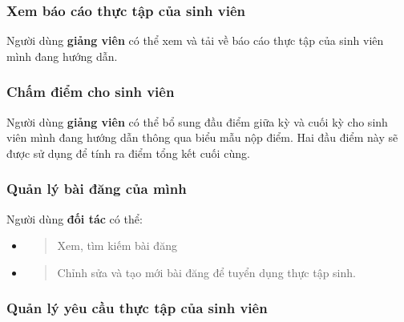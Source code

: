 \documentclass[./../main.tex]{subfiles}
\begin{document}
\hypertarget{xem-buxe1o-cuxe1o-thux1ef1c-tux1eadp-cux1ee7a-sinh-viuxean}{%
	\subsubsection{Xem báo cáo thực tập của sinh
		viên}\label{xem-buxe1o-cuxe1o-thux1ef1c-tux1eadp-cux1ee7a-sinh-viuxean}}
  
Người dùng \textbf{giảng viên} có thể xem và tải về báo cáo thực tập của
sinh viên mình đang hướng dẫn.
  
\hypertarget{chux1ea5m-ux111iux1ec3m-cho-sinh-viuxean}{%
	\subsubsection{Chấm điểm cho sinh
		viên}\label{chux1ea5m-ux111iux1ec3m-cho-sinh-viuxean}}
  
Người dùng \textbf{giảng viên} có thể bổ sung đầu điểm giữa kỳ và cuối
kỳ cho sinh viên mình đang hướng dẫn thông qua biểu mẫu nộp điểm. Hai
đầu điểm này sẽ được sử dụng để tính ra điểm tổng kết cuối cùng.
  
\hypertarget{quux1ea3n-luxfd-buxe0i-ux111ux103ng-cux1ee7a-muxecnh}{%
	\subsubsection{Quản lý bài đăng của
		mình}\label{quux1ea3n-luxfd-buxe0i-ux111ux103ng-cux1ee7a-muxecnh}}
  
Người dùng \textbf{đối tác} có thể:
  
\begin{itemize}
	\item
	      \begin{quote}
	      	Xem, tìm kiếm bài đăng
	      \end{quote}
	\item
	      \begin{quote}
	      	Chỉnh sửa và tạo mới bài đăng để tuyển dụng thực tập sinh.
	      \end{quote}
\end{itemize}
  
\hypertarget{quux1ea3n-luxfd-yuxeau-cux1ea7u-thux1ef1c-tux1eadp-cux1ee7a-sinh-viuxean}{%
	\subsubsection{Quản lý yêu cầu thực tập của sinh
		viên}\label{quux1ea3n-luxfd-yuxeau-cux1ea7u-thux1ef1c-tux1eadp-cux1ee7a-sinh-viuxean}}
  
\end{document}
